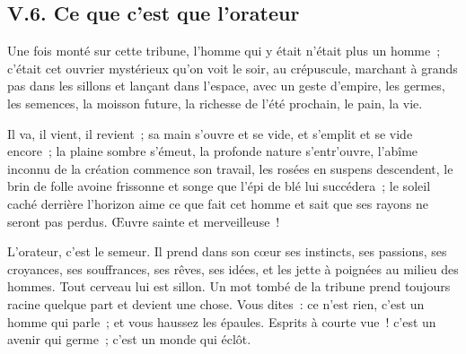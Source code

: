 \documentclass[french,twoside]{book} %
\begin{document}
\subsection[{V.6. Ce que c’est que l’orateur}]{V.6. Ce que c’est que l’orateur}
\noindent Une fois monté sur cette tribune, l’homme qui y était n’était plus un homme ; c’était cet ouvrier mystérieux qu’on voit le soir, au crépuscule, marchant à grands pas dans les sillons et lançant dans l’espace, avec un geste d’empire, les germes, les semences, la moisson future, la richesse de l’été prochain, le pain, la vie.\par
Il va, il vient, il revient ; sa main s’ouvre et se vide, et s’emplit et se vide encore ; la plaine sombre s’émeut, la profonde nature s’entr’ouvre, l’abîme inconnu de la création commence son travail, les rosées en suspens descendent, le brin de folle avoine frissonne et songe que l’épi de blé lui succédera ; le soleil caché derrière l’horizon aime ce que fait cet homme et sait que ses rayons ne seront pas perdus. Œuvre sainte et merveilleuse !\par
L’orateur, c’est le semeur. Il prend dans son cœur ses instincts, ses passions, ses croyances, ses souffrances, ses rêves, ses idées, et les jette à poignées au milieu des hommes. Tout cerveau lui est sillon. Un mot tombé de la tribune prend toujours racine quelque part et devient une chose. Vous dites : ce n’est rien, c’est un homme qui parle ; et vous haussez les épaules. Esprits à courte vue ! c’est un avenir qui germe ; c’est un monde qui éclôt.
\end{document}
